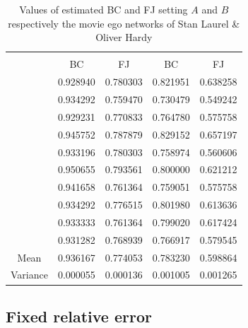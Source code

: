 \begin{table}[h]
	\centering
	\begin{tabular}{l|l|l|l|l|}
		\cline{2-5}
		&\multicolumn{2}{c|}{\fsamp} & \multicolumn{2}{c|}{\base}\\
		\cline{2-5}
		& \multicolumn{1}{c|}{BC} & \multicolumn{1}{c|}{FJ} & \multicolumn{1}{c|}{BC} & \multicolumn{1}{c|}{FJ} \\
		\cline{2-5}
		& 0.928940                & 0.780303                & 0.821951                & 0.638258                \\
		& 0.934292                & 0.759470                & 0.730479                & 0.549242                \\
		& 0.929231                & 0.770833                & 0.764780                & 0.575758                \\
		& 0.945752                & 0.787879                & 0.829152                & 0.657197                \\
		& 0.933196                & 0.780303                & 0.758974                & 0.560606                \\
		& 0.950655                & 0.793561                & 0.800000                & 0.621212                \\
		& 0.941658                & 0.761364                & 0.759051                & 0.575758                \\
		& 0.934292                & 0.776515                & 0.801980                & 0.613636                \\
		& 0.933333                & 0.761364                & 0.799020                & 0.617424                \\
		& 0.931282                & 0.768939                & 0.766917                & 0.579545                \\
		\hline
		\multicolumn{1}{|c|}{Mean}     & 0.936167                & 0.774053                & 0.783230                & 0.598864                \\
		\multicolumn{1}{|c|}{Variance} & 0.000055                & 0.000136                & 0.001005                & 0.001265                \\
		\hline
	\end{tabular}
	\caption{Values of estimated BC and FJ setting $A$ and $B$ respectively the movie ego networks of Stan Laurel \& Oliver Hardy }
	\label{table:stanlio}
\end{table}
\subsection*{Fixed relative error}


